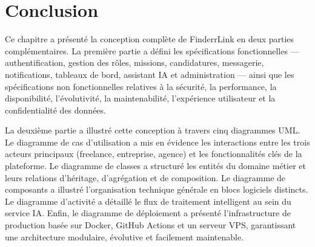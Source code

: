 \section{Conclusion}

Ce chapitre a présenté la conception complète de FinderrLink en deux parties 
complémentaires. La première partie a défini les spécifications fonctionnelles 
— authentification, gestion des rôles, missions, candidatures, messagerie, 
notifications, tableaux de bord, assistant IA et administration — ainsi que les 
spécifications non fonctionnelles relatives à la sécurité, la performance, la 
disponibilité, l'évolutivité, la maintenabilité, l'expérience utilisateur et la 
confidentialité des données.

La deuxième partie a illustré cette conception à travers cinq diagrammes UML. 
Le diagramme de cas d'utilisation a mis en évidence les interactions entre les 
trois acteurs principaux (freelance, entreprise, agence) et les fonctionnalités 
clés de la plateforme. Le diagramme de classes a structuré les entités du 
domaine métier et leurs relations d'héritage, d'agrégation et de composition. 
Le diagramme de composants a illustré l'organisation technique générale en 
blocs logiciels distincts. Le diagramme d'activité a détaillé le flux de 
traitement intelligent au sein du service IA. Enfin, le diagramme de 
déploiement a présenté l'infrastructure de production basée sur Docker, GitHub 
Actions et un serveur VPS, garantissant une architecture modulaire, évolutive 
et facilement maintenable.
